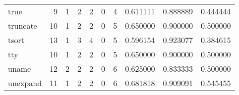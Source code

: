 \begin{longtable}{lrrrrrrrrr}
true      &                                       9 &                                                  1 &                                                  2 &                                                  2 &                                                  0 &                                                  4 &                                           0.611111 &                               0.888889 &                             0.444444 \\
truncate  &                                      10 &                                                  1 &                                                  2 &                                                  2 &                                                  0 &                                                  5 &                                           0.650000 &                               0.900000 &                             0.500000 \\
tsort     &                                      13 &                                                  1 &                                                  3 &                                                  4 &                                                  0 &                                                  5 &                                           0.596154 &                               0.923077 &                             0.384615 \\
tty       &                                      10 &                                                  1 &                                                  2 &                                                  2 &                                                  0 &                                                  5 &                                           0.650000 &                               0.900000 &                             0.500000 \\
uname     &                                      12 &                                                  2 &                                                  2 &                                                  2 &                                                  0 &                                                  6 &                                           0.625000 &                               0.833333 &                             0.500000 \\
unexpand  &                                      11 &                                                  1 &                                                  2 &                                                  2 &                                                  0 &                                                  6 &                                           0.681818 &                               0.909091 &                             0.545455 \\

\end{longtable}
